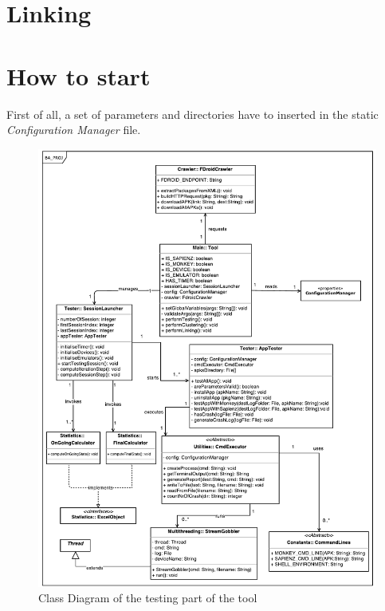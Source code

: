 \section{Linking}


\section{How to start \toolname}
First of all, a set of parameters and directories have to inserted in the static \textit{Configuration Manager} file.



\begin{figure}[htb]
\centering 
\includegraphics[width=\columnwidth]{diagrams/testing.pdf} 
\caption{Class Diagram of the testing part of the tool }
\label{testing}
\vspace{-3mm} 
\end{figure}


